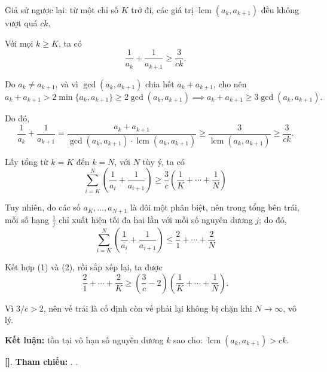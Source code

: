 \documentclass[../2015-n-s.tex]{subfiles}
\begin{document}
\begin{soln}

	Giả sử ngược lại: từ một chỉ số \( K \) trở đi, các giá trị \( \operatorname{lcm}(a_k, a_{k+1}) \) đều không vượt quá \( ck \).
	\begin{claim*}
		Với mọi \(k \ge K\), ta có
		\[
			\frac{1}{a_k} + \frac{1}{a_{k+1}} \ge \frac{3}{ck}.
		\]
	\end{claim*}
	\begin{subproof}
		Do \(a_k \ne a_{k+1}\), và vì \(\gcd(a_k, a_{k+1})\) chia hết \(a_k + a_{k+1}\), cho nên
		\[
			a_k + a_{k+1} > 2\min\{a_k, a_{k+1}\} \ge 2\gcd(a_k, a_{k+1}) \implies a_k + a_{k+1} \ge 3\gcd(a_k, a_{k+1}).
		\]
		
		Do đó,
		\[
			\frac{1}{a_k} + \frac{1}{a_{k+1}} = \frac{a_k + a_{k+1}}{\gcd(a_k, a_{k+1}) \cdot \operatorname{lcm}(a_k, a_{k+1})} \ge \frac{3}{\operatorname{lcm}(a_k, a_{k+1})} \ge \frac{3}{ck}.
		\]
	\end{subproof}
	
	Lấy tổng từ \(k = K\) đến \(k = N\), với \(N\) tùy ý, ta có
	\[
		\sum_{i=K}^N\left( \frac{1}{a_i} + \frac{1}{a_{i+1}} \right) \ge \frac{3}{c}\left( \frac{1}{K} + \cdots + \frac{1}{N} \right) \tag{1}
	\]
	
	Tuy nhiên, do các số \(a_K, \ldots, a_{N+1}\) là đôi một phân biệt, nên trong tổng bên trái,
	mỗi số hạng \( \frac{1}{j} \) chỉ xuất hiện tối đa hai lần với mỗi số nguyên dương \(j\); do đó,
	\[
		\sum_{i=K}^N\left( \frac{1}{a_i} + \frac{1}{a_{i+1}} \right) \le \frac{2}{1} + \cdots + \frac{2}{N}  \tag{2}
	\]
	
	Kết hợp (1) và (2), rồi sắp xếp lại, ta được
	\[
		\frac{2}{1} + \cdots + \frac{2}{K} \ge \left( \frac{3}{c} - 2 \right)\left( \frac{1}{K} + \cdots + \frac{1}{N} \right).
	\]
	
	Vì \(3/c > 2\), nên vế trái là cố định còn vế phải lại không bị chặn khi \(N \to \infty\), vô lý.

	\textbf{Kết luận:} tồn tại vô hạn số nguyên dương \( k \) sao cho: $\operatorname{lcm}(a_k, a_{k+1}) > c k.$

	\vspace{1em}
	\textbf{[]}.
	\textbf{Tham chiếu:} . .
\end{soln}

\end{document}

